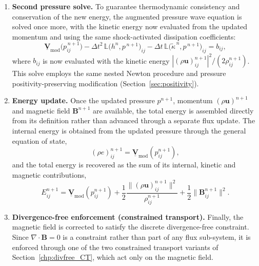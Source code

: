\documentclass[a4paper,fleqn]{cas-sc}
\theoremstyle{definition}
\theoremstyle{remark}
\begin{document}
\begin{enumerate}
\item \textbf{Second pressure solve.}
To guarantee thermodynamic consistency and conservation of the new energy, the
augmented pressure wave equation is solved once more, with the kinetic energy now
evaluated from the updated momentum and using the same shock-activated dissipation
coefficients:
\begin{equation}
\label{eq:fd_pressuresecond}
\underline{\mathbf{V}}_{\mathrm{mod}}\bigl( p^{\,n+1}_{ij}\bigr)
 - \Delta t^{2}\,\mathbb{L}\bigl(h^{n}, p^{\,n+1}\bigr)_{ij}
 - \Delta t\,\mathbb{L}\bigl(\tilde{\kappa}^{\,n}, p^{\,n+1}\bigr)_{ij}
 = b_{ij},
\end{equation}
where $b_{ij}$ is now evaluated with the kinetic energy
$|(\rho\mathbf{u})^{n+1}_{ij}|^{2}/(2\rho^{n+1}_{ij})$. This solve employs the same
nested Newton procedure and pressure positivity-preserving
modification (Section~\ref{sec:positivity}).

\item \textbf{Energy update.}
Once the updated pressure $p^{n+1}$, momentum $(\rho\mathbf{u})^{n+1}$ and magnetic
field $\mathbf{B}^{n+1}$ are available, the total energy is assembled directly from
its definition rather than advanced through a separate flux update. The internal
energy is obtained from the updated pressure through the general equation of state,
\begin{equation}
\label{eq:fd_internal_energy}
(\rho e)^{n+1}_{ij}=\underline{\mathbf{V}}_\mathrm{mod}(p^{n+1}_{ij}),
\end{equation}
and the total energy is recovered as the sum of its internal, kinetic and magnetic
contributions,
\begin{equation}
\label{eq:fd_energy_def}
E^{n+1}_{ij}
=\underline{\mathbf{V}}_{\mathrm{mod}}(p^{n+1}_{ij})
+\frac{1}{2}\frac{\big\|(\rho\mathbf{u})^{n+1}_{ij}\big\|^{2}}{\rho^{n+1}_{ij}}
+\frac{1}{2}\big\|\mathbf{B}^{n+1}_{ij}\big\|^{2}.
\end{equation}

\item \textbf{Divergence-free enforcement (constrained transport).}
Finally, the magnetic field is corrected to satisfy the discrete divergence-free
constraint. Since $\nabla\!\cdot\mathbf{B}=0$ is a constraint rather than part of any
flux sub-system, it is enforced through one of the two constrained transport variants of
Section~\ref{chp:divfree_CT}, which act only on the magnetic field.


\end{enumerate}
\end{document}
